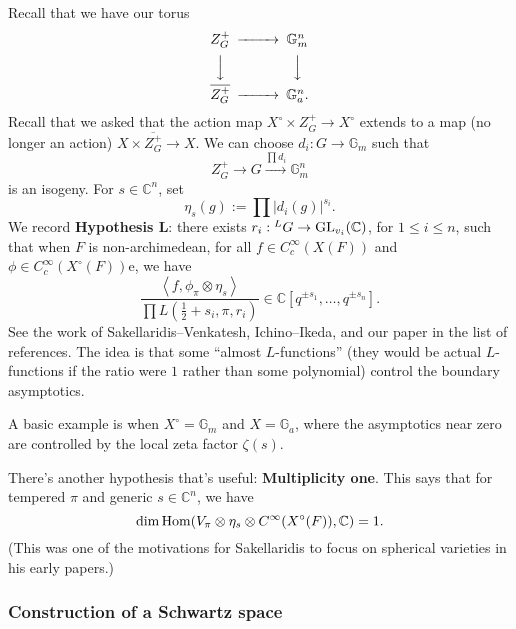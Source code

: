 \documentclass[reqno]{amsart} 
\numberwithin{theorem}{section}
\numberwithin{equation}{section}
\numberwithin{exercise}{section}
\begin{document}
Recall that we have our torus
\begin{equation*}
  \begin{CD}         
    Z_G^+    @>>> \mathbb{G}_m^n\\
    @VVV  @VVV \\
    \overline{Z_G^+}    @>>> \mathbb{G}_a^n. \\
  \end{CD}
\end{equation*}
Recall that we asked that the action map  $X^{\circ} \times Z^+_G \rightarrow X^{\circ}$ extends to a map (no longer an action) $X \times \overline{Z_G^+} \rightarrow X$.  We can choose $d_i : G \rightarrow \mathbb{G}_m$ such that
\begin{equation*}
  Z_G^+ \rightarrow G \xrightarrow{\prod  d_i} \mathbb{G}_m^n
\end{equation*}
is an isogeny.  For $s \in \mathbb{C}^n$, set
\begin{equation*}
  \eta_s(g) := \prod \lvert d_i(g) \rvert^{s_i}.
\end{equation*}
We record \textbf{Hypothesis L}: there exists $r_i :{}^L G \rightarrow \operatorname{GL}_{v_i}(\mathbb{C})$, for $1 \leq i \leq n$, such that when $F$ is non-archimedean, for all $f \in C_c^\infty(X(F))$ and $\phi \in C_c^\infty(X^{\circ}(F))$e, we have
\begin{equation*}
  \frac{\left\langle f, \phi_\pi \otimes \eta_s \right\rangle}{\prod L(\tfrac{1}{2} + s_i, \pi, r_i)} \in \mathbb{C}[q^{\pm s_1}, \dotsc, q^{\pm s_n}].
\end{equation*}
See the work of Sakellaridis--Venkatesh, Ichino--Ikeda, and our paper in the list of references.  The idea is that some ``almost $L$-functions'' (they would be actual $L$-functions if the ratio were $1$ rather than some polynomial) control the boundary asymptotics.

A basic example is when $X^{\circ} = \mathbb{G}_m$ and $X = \mathbb{G}_a$, where the asymptotics near zero are controlled by the local zeta factor $\zeta(s)$.

There's another hypothesis that's useful: \textbf{Multiplicity one}.  This says that for tempered $\pi$ and generic $s \in \mathbb{C}^n$, we have
\begin{equation*}
  \dim \operatorname{Hom}(V_\pi \otimes \eta_s \otimes C^\infty(X^{\circ}(F)), \mathbb{C}) = 1.
\end{equation*}
(This was one of the motivations for Sakellaridis to focus on spherical varieties in his early papers.)

\subsubsection{Construction of a Schwartz space}\label{sec:cq6txpqjrw}
\end{document}
